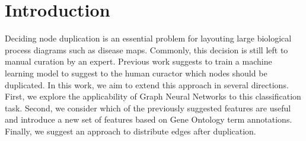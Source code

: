 \documentclass[
	fontsize=10pt, %
	twoside=false, %
	secnumdepth=1, %
  toc=indentunnumbered %
]{kaobook}
\begin{document}




\chapter{Introduction}








Deciding node duplication is an essential problem for
layouting large biological process diagrams such as disease maps. 
Commonly, this decision is still left to manual curation by an expert. Previous
work
\cite{nielsen_MachineLearningSupport_2019}
suggests to train a machine learning model to suggest to the human curactor
which nodes should be duplicated. In this work, we aim to extend this
approach in several directions. First, we explore the applicability of Graph
Neural Networks to this classification task. Second, we consider which of the
previously suggested features are useful and introduce a new set of features
based on Gene Ontology term annotations. Finally, we suggest an approach to
distribute edges after duplication.
\end{document}
